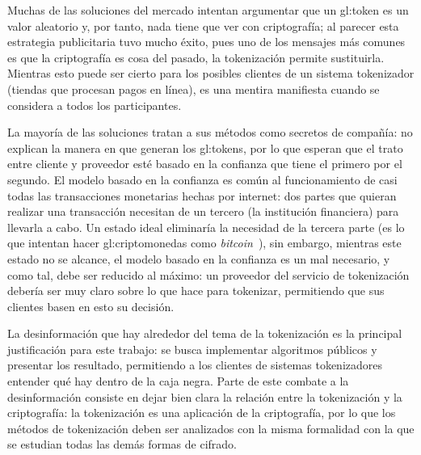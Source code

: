 \begin{description}

\end{description}

Muchas de las soluciones del mercado intentan argumentar que un \gls{gl:token}
es un valor aleatorio y, por tanto, nada tiene que ver con criptografía;
al parecer esta estrategia publicitaria tuvo mucho éxito, pues uno de los
mensajes más comunes es que la criptografía es cosa del pasado, la tokenización
permite sustituirla. Mientras esto puede ser cierto para los posibles clientes
de un sistema tokenizador (tiendas que procesan pagos en línea), es una mentira
manifiesta cuando se considera a todos los  participantes.

La mayoría de las soluciones tratan a sus métodos como secretos de compañía: no
explican la manera en que generan los \glspl{gl:token}, por lo que esperan que
el trato entre cliente y proveedor esté basado en la confianza que tiene el
primero por el segundo. El modelo basado en la confianza es común al
funcionamiento de casi todas las transacciones monetarias hechas por internet:
dos partes que quieran realizar una transacción necesitan de un tercero (la
institución financiera) para llevarla a cabo. Un estado ideal eliminaría la
necesidad de la tercera parte (es lo que intentan hacer
\glspl{gl:criptomoneda} como \textit{bitcoin}~\cite{bitcoin}), sin embargo,
mientras este estado no se alcance, el modelo basado en la confianza es un mal
necesario, y como tal, debe ser reducido al máximo: un proveedor del
servicio de tokenización debería ser muy claro sobre lo que hace para
tokenizar, permitiendo que sus clientes basen en esto su decisión.

La desinformación que hay alrededor del tema de la tokenización es la principal
justificación para este trabajo: se busca implementar algoritmos públicos
y presentar los resultado, permitiendo a los clientes de sistemas tokenizadores
entender qué hay dentro de la caja negra. Parte de este combate a la
desinformación consiste en dejar bien clara la relación entre la tokenización y
la criptografía: la tokenización es una aplicación de la criptografía, por lo
que los métodos de tokenización deben ser analizados con la misma formalidad con
la que se estudian todas las demás formas de cifrado.

